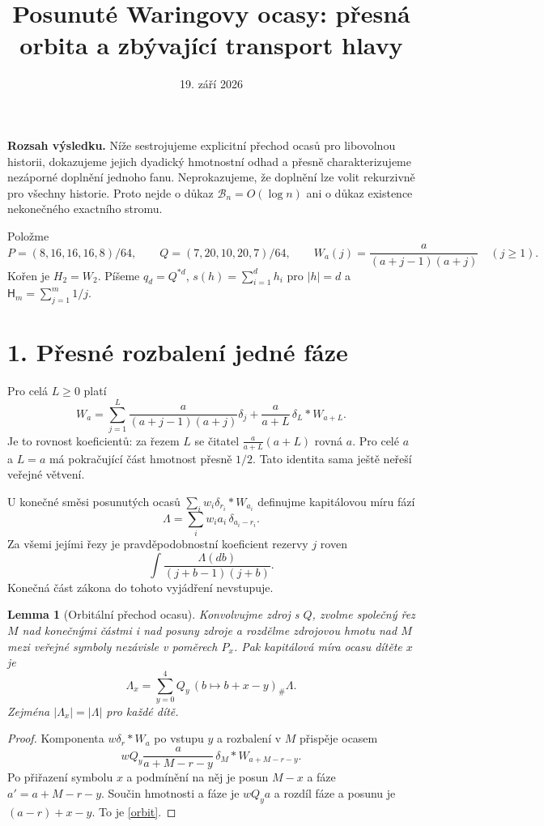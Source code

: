 \documentclass[11pt,a4paper]{article}
\title{Posunuté Waringovy ocasy: přesná orbita a zbývající transport hlavy}
\author{}
\date{19. září 2026}
\newtheorem{lemma}[theorem]{Lemma}
\newcommand{\HH}{\mathsf H}
\begin{document}
\maketitle

\noindent\textbf{Rozsah výsledku.}
Níže sestrojujeme explicitní přechod ocasů pro libovolnou historii,
dokazujeme jejich dyadický hmotnostní odhad a přesně charakterizujeme
nezáporné doplnění jednoho fanu. Neprokazujeme, že doplnění lze volit
rekurzivně pro všechny historie. Proto nejde o důkaz
$\mathcal B_n=O(\log n)$ ani o důkaz existence nekonečného exactního stromu.

Položme
\[
 P=(8,16,16,16,8)/64,\qquad Q=(7,20,10,20,7)/64,
 \qquad W_a(j)=\frac{a}{(a+j-1)(a+j)}\quad(j\ge1).
\]
Kořen je $H_2=W_2$. Píšeme $q_d=Q^{*d}$,
$s(h)=\sum_{i=1}^{d}h_i$ pro $|h|=d$ a $\HH_m=\sum_{j=1}^m1/j$.

\section*{1. Přesné rozbalení jedné fáze}
Pro celá $L\ge0$ platí
\begin{equation}\label{peel}
 W_a=\sum_{j=1}^L\frac{a}{(a+j-1)(a+j)}\delta_j
       +\frac{a}{a+L}\,\delta_L*W_{a+L}.
\end{equation}
Je to rovnost koeficientů: za řezem $L$ se čitatel
$\frac{a}{a+L}(a+L)$ rovná $a$. Pro celé $a$ a $L=a$ má pokračující
část hmotnost přesně $1/2$. Tato identita sama ještě neřeší veřejné větvení.

U konečné směsi posunutých ocasů
$\sum_i w_i\delta_{r_i}*W_{a_i}$ definujme kapitálovou míru fází
\[
 \Lambda=\sum_i w_i a_i\,\delta_{a_i-r_i}.
\]
Za všemi jejími řezy je pravděpodobnostní koeficient rezervy $j$ roven
\[
 \int\frac{\Lambda(db)}{(j+b-1)(j+b)}.
\]
Konečná část zákona do tohoto vyjádření nevstupuje.

\begin{lemma}[Orbitální přechod ocasu]\label{phase}
Konvolvujme zdroj s $Q$, zvolme společný řez $M$ nad konečnými částmi
i nad posuny zdroje a rozdělme zdrojovou hmotu nad $M$ mezi veřejné
symboly nezávisle v poměrech $P_x$. Pak kapitálová míra ocasu dítěte $x$ je
\begin{equation}\label{orbit}
 \boxed{\Lambda_x=\sum_{y=0}^4Q_y\,(b\mapsto b+x-y)_\#\Lambda.}
\end{equation}
Zejména $|\Lambda_x|=|\Lambda|$ pro každé dítě.
\end{lemma}
\begin{proof}
Komponenta $w\delta_r*W_a$ po vstupu $y$ a rozbalení v $M$ přispěje
ocasem
\[
 wQ_y\frac{a}{a+M-r-y}\,
 \delta_M*W_{a+M-r-y}.
\]
Po přiřazení symbolu $x$ a podmínění na něj je posun $M-x$ a fáze
$a'=a+M-r-y$. Součin hmotnosti a fáze je $wQ_ya$ a rozdíl fáze a posunu
je $(a-r)+x-y$. To je \eqref{orbit}.
\end{proof}
\end{document}
